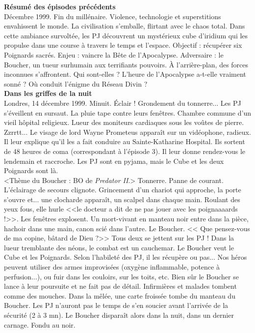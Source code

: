 \documentclass[11pt,twoside,a4paper]{book}
\begin{document}
\textbf{\large R{\'e}sum{\'e} des {\'e}pisodes pr{\'e}c{\'e}dents}~\\
D{\'e}cembre 1999. Fin du mill{\'e}naire. Violence, technologie et superstitions envahissent le monde. La civilisation s'emballe, flirtant avec le chaos total. Dans cette ambiance survolt{\'e}e, les PJ d{\'e}couvrent un myst{\'e}rieux cube d'iridium qui les propulse dans une course {\`a} travers le temps et l'espace. Objectif : r{\'e}cup{\'e}rer six Poignards sacr{\'e}s. Enjeu : vaincre la B{\^e}te de l'Apocalypse. Adversaire : le Boucher, un tueur surhumain aux terrifiants pouvoirs. {\`A} l'arri{\`e}re-plan, des forces inconnues s'affrontent. Qui sont-elles ? L'heure de l'Apocalypse a-t-elle vraiment sonn{\'e} ? O{\`u} conduit l'{\'e}nigme du R{\'e}seau Divin ?~\\

\textbf{\large Dans les griffes de la nuit}~\\

Londres, 14 d{\'e}cembre 1999. Minuit. {\'E}clair ! Grondement du tonnerre... Les PJ s'{\'e}veillent en sursaut. La pluie tape contre leurs fen{\^e}tres. Chambre commune d'un vieil h{\^o}pital religieux. Lueur des moniteurs cardiaques sous les vo{\^u}tes de pierre. Zzrrtt... Le visage de lord Wayne Prometeus appara{\^i}t sur un vid{\'e}ophone, radieux. Il leur explique qu'il les a fait conduire au Sainte-Katharine Hospital. Ils sortent de 48 heures de coma (correspondant {\`a} l'{\'e}pisode 3). Il leur donne rendez-vous le lendemain et raccroche. Les PJ sont en pyjama, mais le Cube et les deux Poignards sont l{\`a}.~\\

<Th{\`e}me du Boucher : BO de \emph{Predator II}.> Tonnerre. Panne de courant. L'{\'e}clairage de secours clignote. Grincement d'un chariot qui approche, la porte s'ouvre et... une clocharde appara{\^i}t, un scalpel dans chaque main. Roulant des yeux fous, elle hurle <<le docteur a dit de ne pas jouer avec les poignaaaards !>>. Les fen{\^e}tres explosent. Un mort-vivant en manteau noir entre dans la pi{\`e}ce, hachoir dans une main, canon sci{\'e} dans l'autre. Le Boucher. << Que pensez-vous de ma copine, b{\^a}tard de Dieu ?>> Tous deux se jettent sur les PJ ! Dans la lueur tremblante des n{\'e}ons, le combat est un cauchemar. Le Boucher veut le Cube et les Poignards. Selon l'habilet{\'e} des PJ, il les r{\'e}cup{\`e}re ou pas... Nos h{\'e}ros peuvent utiliser des armes improvis{\'e}es (oxyg{\`e}ne inflammable, potence {\`a} perfusion...), ou fuir dans les couloirs, sur les toits, etc. Bien s{\^u}r le Boucher se lance {\`a} leur poursuite et ne fait pas de d{\'e}tail. Infirmi{\`e}res et malades tombent comme des mouches. Dans la m{\^e}l{\'e}e, une carte froiss{\'e}e tombe du manteau du Boucher. Les PJ n'auront pas le temps de s'en soucier avant l'arriv{\'e}e de la s{\'e}curit{\'e} (2 {\`a} 3 mn). Le Boucher dispara{\^i}t alors dans la nuit, dans un dernier carnage. Fondu au noir.~\\
\end{document}
